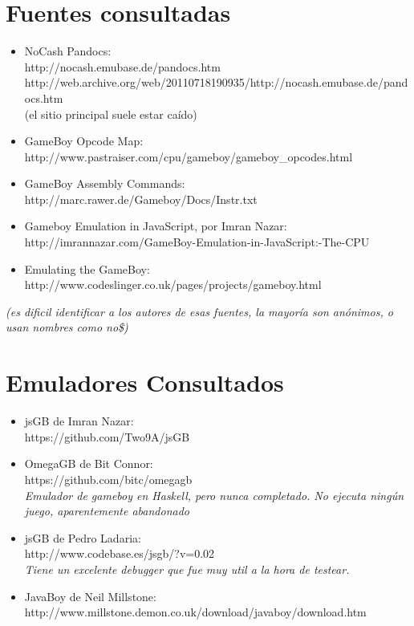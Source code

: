 \documentclass[a4paper,10pt]{report}
\begin{document}
\section*{Fuentes consultadas}
\begin{itemize}
  \item NoCash Pandocs:\\ http://nocash.emubase.de/pandocs.htm\\http://web.archive.org/web/20110718190935/http://nocash.emubase.de/pandocs.htm\\ (el sitio principal suele estar caído)
  \item GameBoy Opcode Map:\\ http://www.pastraiser.com/cpu/gameboy/gameboy\_opcodes.html
  \item GameBoy Assembly Commands:\\ http://marc.rawer.de/Gameboy/Docs/Instr.txt
  \item Gameboy Emulation in JavaScript, por Imran Nazar:\\ http://imrannazar.com/GameBoy-Emulation-in-JavaScript:-The-CPU
  \item Emulating the GameBoy:\\ http://www.codeslinger.co.uk/pages/projects/gameboy.html
\end{itemize}
\small \textit{(es dificil identificar a los autores de esas fuentes, la mayoría son anónimos, o usan nombres como no\$)}
\section*{Emuladores Consultados}
\begin{itemize}
  \item jsGB de Imran Nazar:\\ https://github.com/Two9A/jsGB
  \item OmegaGB de Bit Connor:\\ https://github.com/bitc/omegagb \\ \textit{Emulador de gameboy en Haskell, pero nunca completado. No ejecuta ningún juego, aparentemente abandonado}
  \item jsGB de Pedro Ladaria:\\ http://www.codebase.es/jsgb/?v=0.02 \\ \textit{Tiene un excelente debugger que fue muy util a la hora de testear.}
  \item JavaBoy de Neil Millstone:\\ http://www.millstone.demon.co.uk/download/javaboy/download.htm
\end{itemize}
\end{document}
